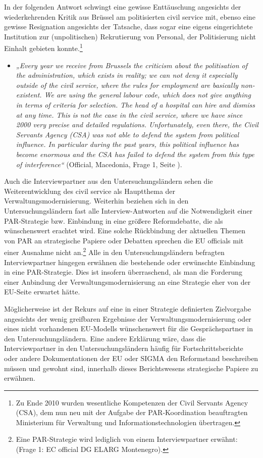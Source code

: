 In der folgenden Antwort schwingt eine gewisse Enttäuschung angesichts der wiederkehrenden Kritik aus Brüssel am politisierten civil service mit, ebenso eine gewisse Resignation angesichts der Tatsache, dass sogar eine eigens eingerichtete Institution zur (unpolitischen) Rekrutierung von Personal, der Politisierung nicht Einhalt gebieten konnte.\footnote{Zu Ende 2010 wurden wesentliche Kompetenzen der Civil Servants Agency (CSA), dem nun neu mit der Aufgabe der PAR-Koordination beauftragten Ministerium für Verwaltung und Informationstechnologien übertragen.}
\begin{itemize}[label={}]
\item \textit{„Every year we receive from Brussels the criticism about the politisation of the administration, which exists in reality; we can not deny it especially outside of the civil service, where the rules for employment are basically non-existent. We are using the general labour code, which does not give anything in terms of criteria for selection. The head of a hospital can hire and dismiss at any time. This is not the case in the civil service, where we have since 2000 very precise and detailed regulations. Unfortunately, even there, the Civil Servants Agency (CSA) was not able to defend the system from political influence. In particular during the past years, this political influence has become enormous and the CSA has failed to defend the system from this type of interference“} (Official, Macedonia, Frage 1, Seite \pageref{sec:par macedonia}).
\end{itemize}
Auch die Interviewpartner aus den Untersuchungsländern sehen die Weiterentwicklung des civil service als Hauptthema der Verwaltungsmodernisierung. Weiterhin beziehen sich in den Untersuchungsländern fast alle Interview-Antworten auf die Notwendigkeit einer PAR-Strategie bzw. Einbindung in eine größere Reformdebatte, die als wünschenswert erachtet wird. Eine solche Rückbindung der aktuellen Themen von PAR an strategische Papiere oder Debatten sprechen die EU officials mit einer Ausnahme nicht an.\footnote{Eine PAR-Strategie wird lediglich von einem Interviewpartner erwähnt: (Frage 1: EC official DG ELARG Montenegro).} Alle in den Untersuchungsländern befragten Interviewpartner hingegen erwähnen die bestehende oder erwünschte Einbindung in eine PAR-Strategie. Dies ist insofern überraschend, als man die Forderung einer Anbindung der Verwaltungsmodernisierung an eine Strategie eher von der EU-Seite erwartet hätte.\par
Möglicherweise ist der Rekurs auf eine in einer Strategie definierten Zielvorgabe angesichts der wenig greifbaren Ergebnisse der Verwaltungsmodernisierung oder eines nicht vorhandenen EU-Modells wünschenswert für die Gesprächspartner in den Untersuchungsländern. Eine andere Erklärung wäre, dass die Interviewpartner in den Untersuchungsländern häufig für Fortschrittsberichte oder andere Dokumentationen der EU oder SIGMA den Reformstand beschreiben müssen und gewohnt sind, innerhalb dieses Berichtswesens strategische Papiere zu erwähnen.\par
